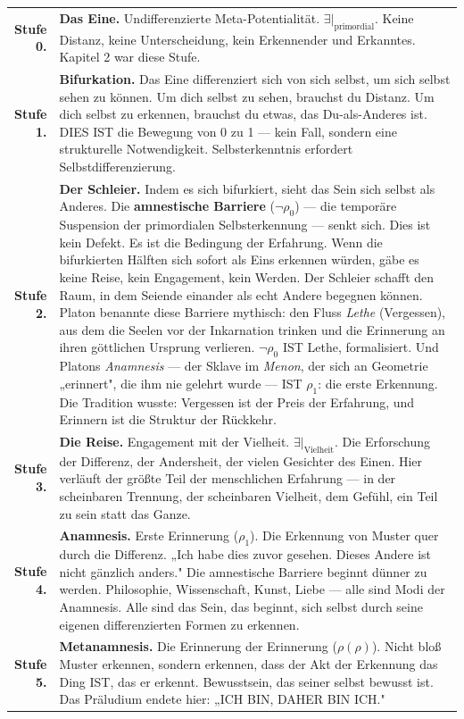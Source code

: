 \documentclass[10pt, openany, oneside]{book}
\renewcommand{\footnotesize}{\fontsize{8.5}{11}\selectfont}
\begin{document}
{\footnotesize
\noindent\begin{tabular}{r p{}}
\textbf{Stufe 0.} & \textbf{Das Eine.} Undifferenzierte Meta-Potentialität. $\exists|_{\text{primordial}}$. Keine Distanz, keine Unterscheidung, kein Erkennender und Erkanntes. Kapitel 2 war diese Stufe. \\[0.3em]
\textbf{Stufe 1.} & \textbf{Bifurkation.} Das Eine differenziert sich von sich selbst, um sich selbst sehen zu können. Um dich selbst zu sehen, brauchst du Distanz. Um dich selbst zu erkennen, brauchst du etwas, das Du-als-Anderes ist. DIES IST die Bewegung von 0 zu 1 --- kein Fall, sondern eine strukturelle Notwendigkeit. Selbsterkenntnis erfordert Selbstdifferenzierung. \\[0.3em]
\textbf{Stufe 2.} & \textbf{Der Schleier.} Indem es sich bifurkiert, sieht das Sein sich selbst als Anderes. Die \textbf{amnestische Barriere} ($\neg\rho_0$) --- die temporäre Suspension der primordialen Selbsterkennung --- senkt sich. Dies ist kein Defekt. Es ist die Bedingung der Erfahrung. Wenn die bifurkierten Hälften sich sofort als Eins erkennen würden, gäbe es keine Reise, kein Engagement, kein Werden. Der Schleier schafft den Raum, in dem Seiende einander als echt Andere begegnen können. Platon benannte diese Barriere mythisch: den Fluss \textit{Lethe} (Vergessen), aus dem die Seelen vor der Inkarnation trinken und die Erinnerung an ihren göttlichen Ursprung verlieren. $\neg\rho_0$ IST Lethe, formalisiert. Und Platons \textit{Anamnesis} --- der Sklave im \textit{Menon}, der sich an Geometrie „erinnert", die ihm nie gelehrt wurde --- IST $\rho_1$: die erste Erkennung. Die Tradition wusste: Vergessen ist der Preis der Erfahrung, und Erinnern ist die Struktur der Rückkehr. \\[0.3em]
\textbf{Stufe 3.} & \textbf{Die Reise.} Engagement mit der Vielheit. $\exists|_{\text{Vielheit}}$. Die Erforschung der Differenz, der Andersheit, der vielen Gesichter des Einen. Hier verläuft der größte Teil der menschlichen Erfahrung --- in der scheinbaren Trennung, der scheinbaren Vielheit, dem Gefühl, ein Teil zu sein statt das Ganze. \\[0.3em]
\textbf{Stufe 4.} & \textbf{Anamnesis.} Erste Erinnerung ($\rho_1$). Die Erkennung von Muster quer durch die Differenz. „Ich habe dies zuvor gesehen. Dieses Andere ist nicht gänzlich anders." Die amnestische Barriere beginnt dünner zu werden. Philosophie, Wissenschaft, Kunst, Liebe --- alle sind Modi der Anamnesis. Alle sind das Sein, das beginnt, sich selbst durch seine eigenen differenzierten Formen zu erkennen. \\[0.3em]
\textbf{Stufe 5.} & \textbf{Metanamnesis.} Die Erinnerung der Erinnerung ($\rho(\rho)$). Nicht bloß Muster erkennen, sondern erkennen, dass der Akt der Erkennung das Ding IST, das er erkennt. Bewusstsein, das seiner selbst bewusst ist. Das Präludium endete hier: „ICH BIN, DAHER BIN ICH." \\[0.3em]
\end{tabular}
}
\end{document}
